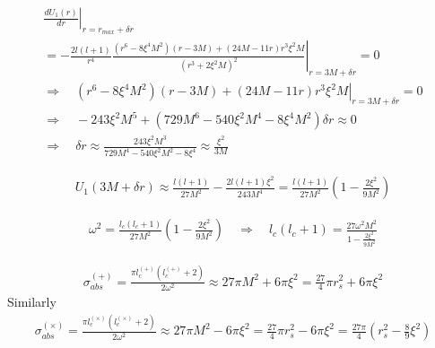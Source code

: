 \documentclass[12pt]{article}
\def\nn{\nonumber}
\begin{document}
\begin{gather}
\left.
\frac{dU_{1}(r)}{dr} 
\right|_{r = r_{max} + \delta r}
\nn \\
=
-
\left.\frac{2 l (l + 1)}{r^{4}}
\frac{(r^{6} - 8 \xi^{4} M^{2}) (r - 3 M) + (24 M - 11 r) r^{3} \xi^{2} M}{(r^{3} + 2 \xi^{2} M)^{2}}
\right|_{r = 3 M + \delta r}
=0
\nn \\
\Rightarrow
\quad
\left.
(r^{6} - 8 \xi^{4} M^{2}) (r - 3 M) + (24 M - 11 r) r^{3} \xi^{2} M 
\right|_{r = 3 M + \delta r}
= 0
\nn \\
\Rightarrow
\quad
- 243 \xi^{2} M^{5}
+
(729 M^{6} - 540 \xi^{2} M^{4} - 8 \xi^{4} M^{2})
\delta r
\approx 0
\nn \\
\Rightarrow
\quad
\delta r
\approx
\frac{243 \xi^{2} M^{3}}{729 M^{4} - 540 \xi^{2} M^{2} - 8 \xi^{4}}
\approx
\frac{\xi^{2}}{3 M}
\end{gather}

\begin{gather}
U_{1}(3 M + \delta r)
\approx
\frac{l (l +1)}{27 M^{2}}
-
\frac{2 l (l+1) \xi^{2}}{243 M^{4}}
=
\frac{l (l +1)}{27 M^{2}}
\left(
1
-
\frac{2 \xi^{2}}{9 M^{2}}
\right)
\end{gather}

\begin{gather}
\omega^{2}
=
\frac{l_{c} (l_{c} +1)}{27 M^{2}}
\left(
1
-
\frac{2 \xi^{2}}{9 M^{2}}
\right)
\quad
\Rightarrow
\quad
l_{c} (l_{c} + 1)
=
\frac{27 \omega^{2} M^{2}}{1- \frac{2 \xi^{2}}{9 M^{2}}}
\end{gather}

\begin{gather}
\sigma_{abs}^{(+)}
=
\frac{\pi l_{c}^{(+)}( l_{c}^{(+)} + 2)}{2 \omega^{2}}
\approx
27 \pi M^{2} + 6 \pi \xi^{2}
=
\frac{27}{4}
\pi 
r_{s}^{2}
+
6 \pi \xi^{2} 
\end{gather}
Similarly
\begin{gather}
\sigma_{abs}^{(\times)}
=
\frac{\pi l_{c}^{(\times)}( l_{c}^{(\times)} + 2)}{2 \omega^{2}}
\approx
27 \pi M^{2} - 6 \pi \xi^{2}
=
\frac{27}{4}
\pi 
r_{s}^{2}
-
6 \pi \xi^{2} 
=
\frac{27 \pi }{4}
(r_{s}^{2} - \frac{8}{9} \xi^{2})
\end{gather}




















%
%
\end{document}
